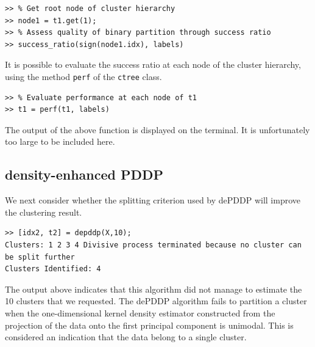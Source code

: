 \documentclass{book}
\begin{document}
\begin{verbatim}
>> % Get root node of cluster hierarchy
>> node1 = t1.get(1);
>> % Assess quality of binary partition through success ratio
>> success_ratio(sign(node1.idx), labels)
\end{verbatim}


It is possible to evaluate the success ratio at each node of the cluster hierarchy,
using the method {\tt perf} of the {\tt ctree} class. 

\begin{verbatim}
>> % Evaluate performance at each node of t1
>> t1 = perf(t1, labels)
\end{verbatim}

\noindent
The output of the above function is displayed on the terminal. It is unfortunately
too large to be included here.

\subsection{density-enhanced PDDP}

We next consider whether the splitting criterion used by dePDDP will
improve the clustering result.


\begin{verbatim}
>> [idx2, t2] = depddp(X,10);
Clusters: 1 2 3 4 Divisive process terminated because no cluster can be split further
Clusters Identified: 4
\end{verbatim}

\noindent
%
The output above indicates that this algorithm did not manage to estimate the
10 clusters that we requested. The dePDDP algorithm fails to partition a
cluster when the one-dimensional kernel density estimator constructed from the
projection of the data onto the first principal component is unimodal.
This is considered an indication that the data belong to a single cluster.
\end{document}
